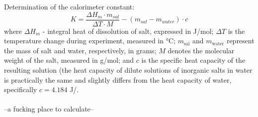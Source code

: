 \documentclass[12pt, letterpaper]{article}
\begin{document}
        
     Determination of the calorimeter constant:
    \begin{equation}
       K = \frac{\Delta H_m \cdot m_{sal}}{ \Delta T \cdot M} - \left(m_{sal} - m_{water}\right) \cdot c 
    \end{equation}
        where $\Delta H_m$ - integral heat of dissolution of salt, expressed in J/mol;
        $\Delta T$ is the temperature change during experiment, measured in °C; 
        $m_{\text{sal}}$ and $m_{\text{water}}$ represent the mass of salt and water, respectively, in grams; 
        $M$ denotes the molecular weight of the salt, measured in g/mol; 
        and $c$ is the specific heat capacity of the resulting solution
        (the heat capacity of dilute solutions of inorganic salts in water is practically the same and slightly differs from the heat capacity of water, specifically $c = 4.184$ J/. \\ \\



        --a fucking place to calculate--
\end{document}
